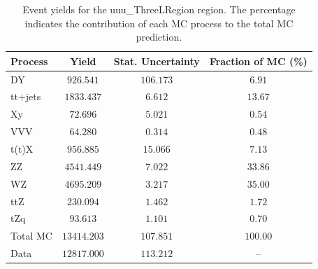 \begin{table}[htbp]
\centering
\caption{Event yields for the uuu\_ThreeLRegion region. The percentage indicates the contribution of each MC process to the total MC prediction.}
\label{tab:uuu_ThreeLRegion_yields}
\begin{tabular}{lccc}
\hline
Process & Yield & Stat. Uncertainty & Fraction of MC (\%) \\
\hline
DY & $926.541$ & $106.173$ & $6.91$ \\
tt+jets & $1833.437$ & $6.612$ & $13.67$ \\
Xy & $72.696$ & $5.021$ & $0.54$ \\
VVV & $64.280$ & $0.314$ & $0.48$ \\
t(t)X & $956.885$ & $15.066$ & $7.13$ \\
ZZ & $4541.449$ & $7.022$ & $33.86$ \\
WZ & $4695.209$ & $3.217$ & $35.00$ \\
ttZ & $230.094$ & $1.462$ & $1.72$ \\
tZq & $93.613$ & $1.101$ & $0.70$ \\
\hline
Total MC & $13414.203$ & $107.851$ & $100.00$ \\
Data & $12817.000$ & $113.212$ & -- \\
\hline
\end{tabular}
\end{table}

